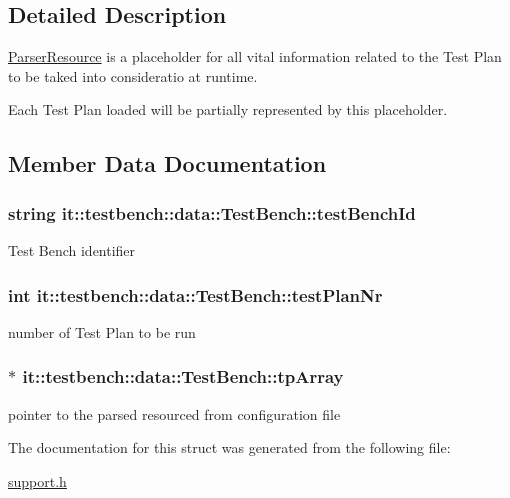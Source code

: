 \subsection{Detailed Description}
\hyperlink{structit_1_1testbench_1_1data_1_1ParserResource}{Parser\-Resource} is a placeholder for all vital information related to the Test Plan to be taked into consideratio at runtime.

Each Test Plan loaded will be partially represented by this placeholder. 

\subsection{Member Data Documentation}
\hypertarget{structit_1_1testbench_1_1data_1_1TestBench_ad0fe47994f2f80cf9d3aa2fa5189a0b9}{
\subsubsection[{test\-Bench\-Id}]{\setlength{\rightskip}{0pt plus 5cm}string it\-::testbench\-::data\-::\-Test\-Bench\-::test\-Bench\-Id}}\label{d4/d85/structit_1_1testbench_1_1data_1_1TestBench_ad0fe47994f2f80cf9d3aa2fa5189a0b9}
Test Bench identifier \hypertarget{structit_1_1testbench_1_1data_1_1TestBench_ad04af24bef55a0e3c41a3c856da57190}{
\subsubsection[{test\-Plan\-Nr}]{\setlength{\rightskip}{0pt plus 5cm}int it\-::testbench\-::data\-::\-Test\-Bench\-::test\-Plan\-Nr}}\label{d4/d85/structit_1_1testbench_1_1data_1_1TestBench_ad04af24bef55a0e3c41a3c856da57190}
number of Test Plan to be run \hypertarget{structit_1_1testbench_1_1data_1_1TestBench_a056b9bf182af95a7ddc6e0f1fd1a0649}{
\subsubsection[{tp\-Array}]{$\ast$ it\-::testbench\-::data\-::\-Test\-Bench\-::tp\-Array}}\label{d4/d85/structit_1_1testbench_1_1data_1_1TestBench_a056b9bf182af95a7ddc6e0f1fd1a0649}
pointer to the parsed resourced from configuration file 

The documentation for this struct was generated from the following file\-:\begin{DoxyCompactItemize}
\item 
\hyperlink{support_8h}{support.\-h}\end{DoxyCompactItemize}
